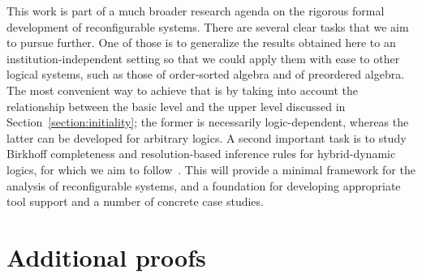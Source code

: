 \documentclass[a4paper,UKenglish,cleveref,autoref]{lipics-v2019}
\begin{document}
This work is part of a much broader research agenda on the rigorous formal development of reconfigurable systems.
There are several clear tasks that we aim to pursue further.
One of those is to generalize the results obtained here to an institution-independent setting so that we could apply them with ease to other logical systems, such as those of order-sorted algebra and of preordered algebra.
The most convenient way to achieve that is by taking into account the relationship between the basic level and the upper level discussed in Section~\ref{section:initiality}; the former is necessarily logic-dependent, whereas the latter can be developed for arbitrary logics.
A second important task is to study Birkhoff completeness and resolution-based inference rules for hybrid-dynamic logics, for which we aim to follow~\cite{Gaina17Bir,TutuF17}.
This will provide a minimal framework for the analysis of reconfigurable systems, and a foundation for developing appropriate tool support and a number of concrete case studies.





\appendix

\section{Additional proofs}
\end{document}
